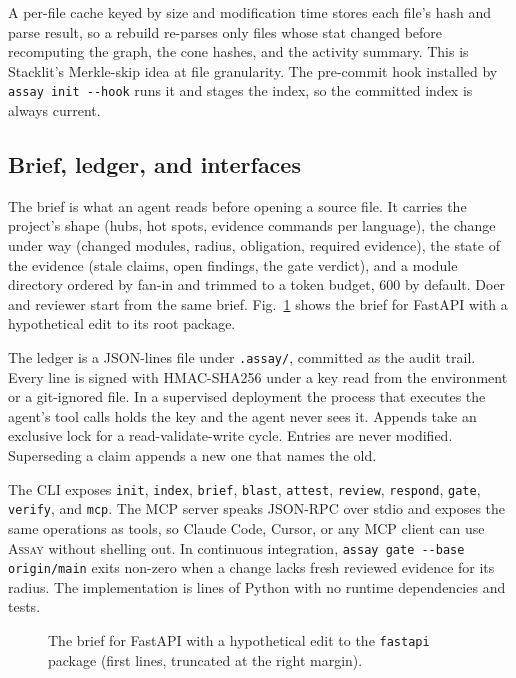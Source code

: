 \documentclass[conference]{IEEEtran}
\newcommand{\assay}{\textsc{Assay}}
\begin{document}
A per-file cache keyed by size and modification time stores each file's hash and parse result, so a rebuild re-parses only files whose stat changed before recomputing the graph, the cone hashes, and the activity summary. This is Stacklit's Merkle-skip idea at file granularity. The pre-commit hook installed by \texttt{assay init -{}-hook} runs it and stages the index, so the committed index is always current.

\subsection{Brief, ledger, and interfaces}

The brief is what an agent reads before opening a source file. It carries the project's shape (hubs, hot spots, evidence commands per language), the change under way (changed modules, radius, obligation, required evidence), the state of the evidence (stale claims, open findings, the gate verdict), and a module directory ordered by fan-in and trimmed to a token budget, 600 by default. Doer and reviewer start from the same brief. Fig.~\ref{lst:brief} shows the brief for FastAPI with a hypothetical edit to its root package.

The ledger is a JSON-lines file under \texttt{.assay/}, committed as the audit trail. Every line is signed with HMAC-SHA256 under a key read from the environment or a git-ignored file. In a supervised deployment the process that executes the agent's tool calls holds the key and the agent never sees it. Appends take an exclusive lock for a read-validate-write cycle. Entries are never modified. Superseding a claim appends a new one that names the old.

The CLI exposes \texttt{init}, \texttt{index}, \texttt{brief}, \texttt{blast}, \texttt{attest}, \texttt{review}, \texttt{respond}, \texttt{gate}, \texttt{verify}, and \texttt{mcp}. The MCP server speaks JSON-RPC over stdio and exposes the same operations as tools, so Claude Code, Cursor, or any MCP client can use \assay{} without shelling out. In continuous integration, \texttt{assay gate -{}-base origin/main} exits non-zero when a change lacks fresh reviewed evidence for its radius. The implementation is \LocCore{} lines of Python with no runtime dependencies and \NumTests{} tests.

\begin{figure}[t]

\caption{The brief for FastAPI with a hypothetical edit to the \texttt{fastapi} package (first lines, truncated at the right margin).}
\label{lst:brief}
\end{figure}
\end{document}
